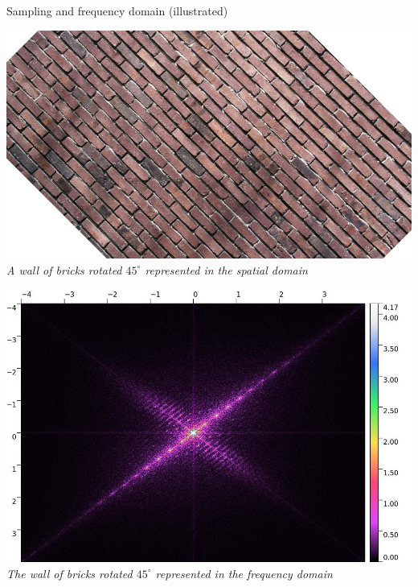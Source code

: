 \begin{frame}{Sampling and frequency domain (illustrated)}
  \begin{minipage}[b]{0.45\textwidth}
    \centering
    \includegraphics[width=\textwidth]{slides/graphics-theory/bricks-rotation.jpg}\\
    \textit{\small A wall of bricks rotated \(45^{\circ}\) represented in the spatial domain}
  \end{minipage}
  \hfill
  \begin{minipage}[b]{0.45\textwidth}
    \centering
    \includegraphics[width=\textwidth]{slides/graphics-theory/bricks-fft-rotation.jpg}\\
    \textit{\small The wall of bricks rotated \(45^{\circ}\) represented in the frequency domain}
  \end{minipage}
\end{frame}

